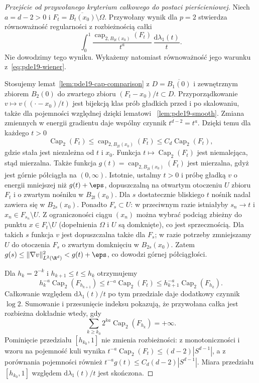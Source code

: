 \begin{proof}[Przejście od przywołanego kryterium całkowego do postaci pierścieniowej]
Niech $a=d-2>0$ i
$F_t=\overline{B_t(x_0)}\setminus\Omega$.
Przywołany wynik dla $p=2$ stwierdza równoważność
regularności z rozbieżnością całki
\[
 \int_0^1
 \frac{\operatorname{cap}_{2,B_{2t}(x_0)}(F_t)}
 {t^a}\,\frac{\mathrm d\lambda_1(t)}{t}.
\]
Nie dowodzimy tego wyniku. Wykażemy natomiast
równoważność jego warunku z~\eqref{eq:pde19-wiener}.

Stosujemy lemat~\ref{lem:pde19-cap-comparison}
z $D=\overline{B_1(0)}$ i zewnętrznym zbiorem $B_2(0)$
do zwartego zbioru $(F_t-x_0)/t\subset D$.
Przyporządkowanie $v\mapsto v((\cdot-x_0)/t)$
jest bijekcją klas prób gładkich przed i po skalowaniu,
także dla pojemności względnej dzięki lematowi
~\ref{lem:pde19-smooth}. Zmiana zmiennych w energii
gradientu daje wspólny czynnik $t^{d-2}=t^a$.
Dzięki temu dla każdego $t>0$
\[
 \operatorname{Cap}_2(F_t)
 \le\operatorname{cap}_{2,B_{2t}(x_0)}(F_t)
 \le C_d\operatorname{Cap}_2(F_t),
\]
gdzie stała jest niezależna od $t$ i $x_0$.
Funkcja $t\mapsto\operatorname{Cap}_2(F_t)$ jest
niemalejąca, stąd mierzalna. Także funkcja
$g(t)=\operatorname{cap}_{2,B_{2t}(x_0)}(F_t)$ jest
mierzalna, gdyż jest górnie półciągła na $(0,\infty)$.
Istotnie, ustalmy $t>0$ i próbę gładką $v$ o energii
mniejszej niż $g(t)+\eps$, dopuszczalną na otwartym
otoczeniu $U$ zbioru $F_t$ i o zwartym nośniku
w $B_{2t}(x_0)$. Dla $s$ dostatecznie bliskiego $t$
nośnik nadal zawiera się w $B_{2s}(x_0)$.
Ponadto $F_s\subset U$: w przeciwnym razie istniałyby
$s_n\to t$ i $x_n\in F_{s_n}\setminus U$. Z ograniczoności
ciągu $(x_n)$ można wybrać podciąg zbieżny do punktu
$x\in F_t\setminus U$ (dopełnienia $\Omega$ i $U$ są
domknięte), co jest sprzecznością.
Dla takich $s$ funkcja $v$ jest dopuszczalna także
dla $F_s$; w razie potrzeby zmniejszamy $U$ do otoczenia
$F_s$ o zwartym domknięciu w $B_{2s}(x_0)$.
Zatem $g(s)\le \|\nabla v\|_{L^2(\R^d)}^2<g(t)+\eps$,
co dowodzi górnej półciągłości.

Dla $h_k=2^{-k}$
i $h_{k+1}\le t\le h_k$ otrzymujemy
\[
 h_k^{-a}\operatorname{Cap}_2(F_{h_{k+1}})
 \le t^{-a}\operatorname{Cap}_2(F_t)
 \le h_{k+1}^{-a}\operatorname{Cap}_2(F_{h_k}).
\]
Całkowanie względem $\mathrm d\lambda_1(t)/t$
po tym przedziale daje dodatkowy czynnik $\log 2$.
Sumowanie i przesunięcie indeksu pokazują, że
przywołana całka jest rozbieżna dokładnie wtedy, gdy
\[
 \sum_{k\ge k_0}2^{ka}\operatorname{Cap}_2(F_{h_k})
 =+\infty.
\]
Pominięcie przedziału $[h_{k_0},1]$ nie zmienia
rozbieżności: z monotoniczności i wzoru na pojemność
kuli wynika $t^{-a}\operatorname{Cap}_2(F_t)\le
(d-2)|S^{d-1}|$, a z porównania pojemności również
$t^{-a}g(t)\le C_d(d-2)|S^{d-1}|$. Miara przedziału
$[h_{k_0},1]$ względem $\mathrm d\lambda_1(t)/t$
jest skończona.


\end{proof}

